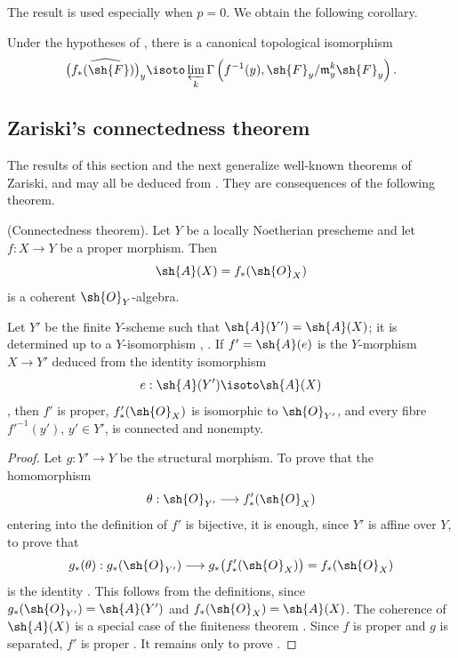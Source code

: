 \begin{env}[4.2.3]
\label{III.4.2.3}
The result  is used especially when $p=0$.
We obtain the following corollary.
\end{env}

\begin{corollary}[4.2.4]
\label{III.4.2.4}
Under the hypotheses of , there is a canonical
topological isomorphism
\[
  \widehat{\bigl(f_*(\sh{F})\bigr)_y}
  \isoto
  \varprojlim_k
  \Gamma\left(
    f^{-1}(y),
    \sh{F}_y/\mathfrak{m}_y^k\sh{F}_y
  \right).
\]
\end{corollary}


\subsection{Zariski's connectedness theorem}
\label{subsection:III.4.3}

The results of this section and the next generalize well-known
theorems of Zariski, and may all be deduced from
.  They are consequences of the following theorem.

\begin{theorem}[4.3.1]
\label{III.4.3.1}
\textnormal{(Connectedness theorem).}
Let $Y$ be a locally Noetherian prescheme and let $f:X\to Y$ be a
proper morphism.  Then
\[
  \sh{A}(X)=f_*(\sh{O}_X)
\]
is a coherent $\sh{O}_Y$-algebra.


Let $Y'$ be the finite $Y$-scheme such that
$\sh{A}(Y')=\sh{A}(X)$; it is determined up to a $Y$-isomorphism
, .
If $f'=\sh{A}(e)$ is the $Y$-morphism $X\to Y'$ deduced from the
identity isomorphism
\[
  e:\sh{A}(Y')\isoto\sh{A}(X)
\]
, then $f'$ is proper,
$f'_*(\sh{O}_X)$ is isomorphic to $\sh{O}_{Y'}$, and every fibre
$f'^{-1}(y')$, $y'\in Y'$, is connected and nonempty.
\end{theorem}

\begin{proof}
Let $g:Y'\to Y$ be the structural morphism.  To prove that the
homomorphism
\[
  \theta:\sh{O}_{Y'}\longrightarrow f'_*(\sh{O}_X)
\]
entering into the definition of $f'$ is bijective, it is enough,
since $Y'$ is affine over $Y$, to prove that
\[
  g_*(\theta):
  g_*(\sh{O}_{Y'})
  \longrightarrow
  g_*\bigl(f'_*(\sh{O}_X)\bigr)
  =
  f_*(\sh{O}_X)
\]
is the identity .  This follows from the
definitions, since
$g_*(\sh{O}_{Y'})=\sh{A}(Y')$ and
$f_*(\sh{O}_X)=\sh{A}(X)$.
The coherence of $\sh{A}(X)$ is a special case of the finiteness
theorem .  Since $f$ is proper and $g$ is separated,
$f'$ is proper .  It remains only to prove
.
\end{proof}

